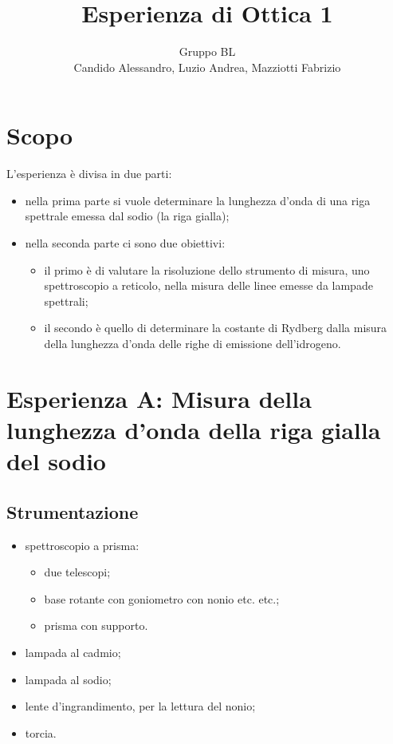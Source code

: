 \documentclass[a4paper,10pt]{article}
\title{Esperienza di Ottica 1}
\author{Gruppo BL \\ Candido Alessandro, Luzio Andrea, Mazziotti Fabrizio}
\begin{document}
\maketitle

\section{Scopo}
L'esperienza è divisa in due parti:
\begin{itemize}
	\item nella prima parte si vuole determinare la lunghezza d’onda di una riga spettrale emessa dal sodio (la riga gialla);
	\item nella seconda parte ci sono due obiettivi:
	\begin{itemize}
		\item il primo è di valutare la risoluzione dello strumento di misura, uno spettroscopio a reticolo, nella misura delle linee emesse da lampade spettrali;
		\item il secondo è quello di determinare la costante di Rydberg dalla misura della lunghezza d’onda delle righe di emissione dell’idrogeno.
	\end{itemize}
\end{itemize}

\section{Esperienza A: Misura della lunghezza d'onda della riga gialla del sodio}

\subsection{Strumentazione}

\begin{itemize}
	\item spettroscopio a prisma:
	\begin{itemize} %
		\item due telescopi;
		\item base rotante con goniometro con nonio etc. etc.;
		\item prisma con supporto.
	\end{itemize}
	\item lampada al cadmio;
	\item lampada al sodio;
	\item lente d'ingrandimento, per la lettura del nonio;
	\item torcia.
\end{itemize}
\end{document}
